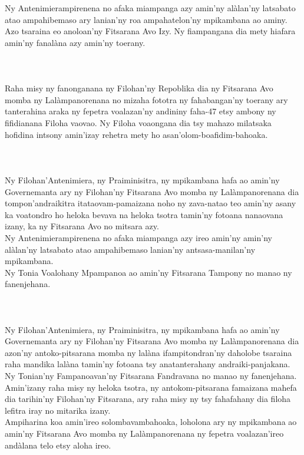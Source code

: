 \documentclass[12pt]{article}
\newcounter{laharana}
\newcommand{\andininy}[0]{
  \paragraph{%
    \NoCaseChange{%
      Andininy~\addtocounter{laharana}{1}\thelaharana.}\label{and:\thelaharana}~%
  }%
}
\begin{document}
\noindent
Ny Antenimierampirenena no afaka miampanga azy amin'ny alàlan'ny latsabato atao
ampahibemaso ary lanian'ny roa ampahatelon'ny mpikambana ao aminy.\\

\noindent
Azo tsaraina eo anoloan'ny Fitsarana Avo Izy. Ny fiampangana dia mety hiafara
amin'ny fanalàna azy amin'ny toerany.

\andininy{}Raha misy ny fanonganana ny Filohan'ny Repoblika dia ny Fitsarana
Avo momba ny Lalàmpanorenana no mizaha fototra ny fahabangan'ny toerany ary
tanterahina araka ny fepetra voalazan'ny andininy faha-47 etsy ambony ny
fifidianana Filoha vaovao. Ny Filoha voaongana dia tsy mahazo milatsaka hofidina
intsony amin'izay rehetra mety ho asan'olom-boafidim-bahoaka.

\andininy{}Ny Filohan'Antenimiera, ny Praiminisitra, ny mpikambana hafa ao
amin'ny Governemanta ary ny Filohan'ny Fitsarana Avo momba ny Lalàmpanorenana
dia tompon'andraikitra itataovam-pamaizana noho ny zava-natao teo amin'ny asany
ka voatondro ho heloka bevava na heloka tsotra tamin'ny fotoana nanaovana izany,
ka ny Fitsarana Avo no mitsara azy.\\

\noindent
Ny Antenimierampirenena no afaka miampanga azy ireo amin'ny amin'ny alàlan'ny
latsabato atao ampahibemaso lanian'ny antsasa-manilan'ny mpikambana.\\

\noindent
Ny Tonia Voalohany Mpampanoa ao amin'ny Fitsarana Tampony no manao ny
fanenjehana.

\andininy{}Ny Filohan'Antenimiera, ny Praiminisitra, ny mpikambana hafa ao
amin'ny Governemanta ary ny Filohan'ny Fitsarana Avo momba ny Lalàmpanorenana
dia azon'ny antoko-pitsarana momba ny lalàna ifampitondran'ny daholobe tsaraina
raha mandika lalàna tamin'ny fotoana tsy anatanterahany andraiki-panjakana.\\

\noindent
Ny Tonian'ny Fampanoavan'ny Fitsarana Fandravana no manao ny fanenjehana.\\

\noindent
Amin'izany raha misy ny heloka tsotra, ny antokom-pitsarana famaizana mahefa dia
tarihin'ny Filohan'ny Fitsarana, ary raha misy ny tsy fahafahany dia filoha
lefitra iray no mitarika izany.\\

\noindent
Ampiharina koa amin'ireo solombavambahoaka, loholona ary ny mpikambana ao
amin'ny Fitsarana Avo momba ny Lalàmpanorenana ny fepetra voalazan'ireo andàlana
telo etsy aloha ireo.
\end{document}
